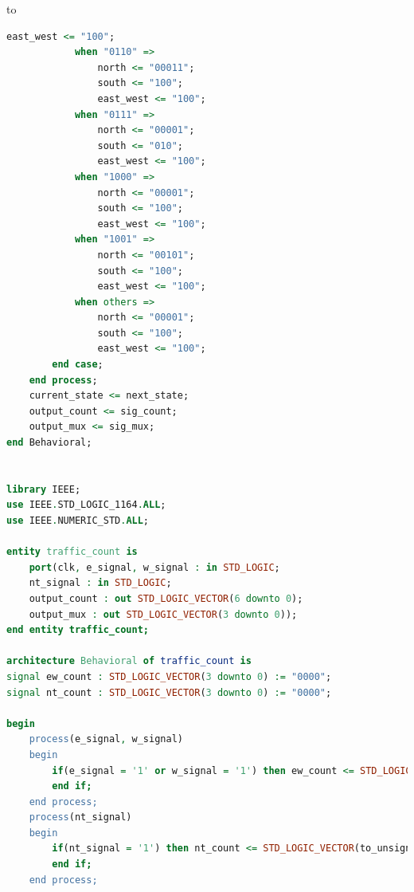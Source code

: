 to\documentclass[11pt]{article}
\begin{document}
\begin{appendices}
\begin{lstlisting}[language=VHDL]
                east_west <= "100";
            when "0110" =>
                north <= "00011";
                south <= "100";
                east_west <= "100";
            when "0111" =>
                north <= "00001";
                south <= "010";
                east_west <= "100";
            when "1000" =>
                north <= "00001";
                south <= "100";
                east_west <= "100";
            when "1001" =>
                north <= "00101";
                south <= "100";
                east_west <= "100";
            when others =>
                north <= "00001";
                south <= "100";
                east_west <= "100";
        end case;
    end process;
    current_state <= next_state;
    output_count <= sig_count;
    output_mux <= sig_mux;
end Behavioral;


library IEEE;
use IEEE.STD_LOGIC_1164.ALL;
use IEEE.NUMERIC_STD.ALL;

entity traffic_count is
    port(clk, e_signal, w_signal : in STD_LOGIC;
    nt_signal : in STD_LOGIC;
    output_count : out STD_LOGIC_VECTOR(6 downto 0);
    output_mux : out STD_LOGIC_VECTOR(3 downto 0));
end entity traffic_count;

architecture Behavioral of traffic_count is
signal ew_count : STD_LOGIC_VECTOR(3 downto 0) := "0000";
signal nt_count : STD_LOGIC_VECTOR(3 downto 0) := "0000";

begin
    process(e_signal, w_signal)
    begin
        if(e_signal = '1' or w_signal = '1') then ew_count <= STD_LOGIC_VECTOR(to_unsigned(to_integer(unsigned(ew_count)) + 1, 4));
        end if;
    end process;
    process(nt_signal)
    begin
        if(nt_signal = '1') then nt_count <= STD_LOGIC_VECTOR(to_unsigned(to_integer(unsigned(ew_count)) + 1, 4));
        end if;
    end process;
    

\end{lstlisting}
\end{appendices}
\end{document}
